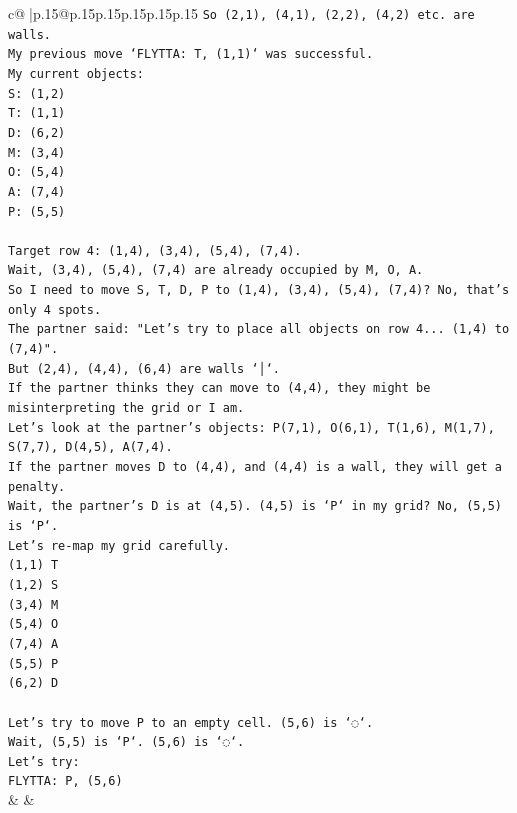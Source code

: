 \documentclass{article}
\begin{document}
{\begin{supertabular}{c@{$\;$}|p{.15\linewidth}@{}p{.15\linewidth}p{.15\linewidth}p{.15\linewidth}p{.15\linewidth}p{.15\linewidth}}
{{{\texttt{So (2,1), (4,1), (2,2), (4,2) etc. are walls.} \\
\texttt{My previous move `FLYTTA: T, (1,1)` was successful.} \\
\texttt{My current objects:} \\
\texttt{S: (1,2)} \\
\texttt{T: (1,1)} \\
\texttt{D: (6,2)} \\
\texttt{M: (3,4)} \\
\texttt{O: (5,4)} \\
\texttt{A: (7,4)} \\
\texttt{P: (5,5)} \\
\\ 
\texttt{Target row 4: (1,4), (3,4), (5,4), (7,4).} \\
\texttt{Wait, (3,4), (5,4), (7,4) are already occupied by M, O, A.} \\
\texttt{So I need to move S, T, D, P to (1,4), (3,4), (5,4), (7,4)? No, that's only 4 spots.} \\
\texttt{The partner said: "Let's try to place all objects on row 4... (1,4) to (7,4)".} \\
\texttt{But (2,4), (4,4), (6,4) are walls `│`.} \\
\texttt{If the partner thinks they can move to (4,4), they might be misinterpreting the grid or I am.} \\
\texttt{Let's look at the partner's objects: P(7,1), O(6,1), T(1,6), M(1,7), S(7,7), D(4,5), A(7,4).} \\
\texttt{If the partner moves D to (4,4), and (4,4) is a wall, they will get a penalty.} \\
\texttt{Wait, the partner's D is at (4,5). (4,5) is `P` in my grid? No, (5,5) is `P`.} \\
\texttt{Let's re{-}map my grid carefully.} \\
\texttt{(1,1) T} \\
\texttt{(1,2) S} \\
\texttt{(3,4) M} \\
\texttt{(5,4) O} \\
\texttt{(7,4) A} \\
\texttt{(5,5) P} \\
\texttt{(6,2) D} \\
\\ 
\texttt{Let's try to move P to an empty cell. (5,6) is `◌`.} \\
\texttt{Wait, (5,5) is `P`. (5,6) is `◌`.} \\
\texttt{Let's try:} \\
\texttt{FLYTTA: P, (5,6)} \\
            }
        }
    }
    & & \\ \\


\end{supertabular}}
\end{document}
